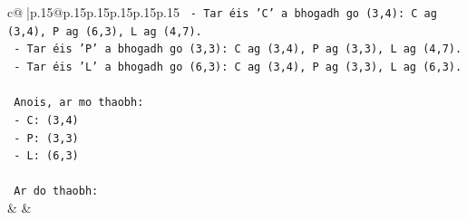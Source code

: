 \documentclass{article}
\begin{document}
{\begin{supertabular}{c@{$\;$}|p{.15\linewidth}@{}p{.15\linewidth}p{.15\linewidth}p{.15\linewidth}p{.15\linewidth}p{.15\linewidth}}
{{{\texttt{   {-} Tar éis 'C' a bhogadh go (3,4): C ag (3,4), P ag (6,3), L ag (4,7).} \\
\texttt{   {-} Tar éis 'P' a bhogadh go (3,3): C ag (3,4), P ag (3,3), L ag (4,7).} \\
\texttt{   {-} Tar éis 'L' a bhogadh go (6,3): C ag (3,4), P ag (3,3), L ag (6,3).} \\
\\ 
\texttt{   Anois, ar mo thaobh:} \\
\texttt{   {-} C: (3,4)} \\
\texttt{   {-} P: (3,3)} \\
\texttt{   {-} L: (6,3)} \\
\\ 
\texttt{   Ar do thaobh:} \\
            }
        }
    }
    & & \\ \\


\end{supertabular}}
\end{document}
